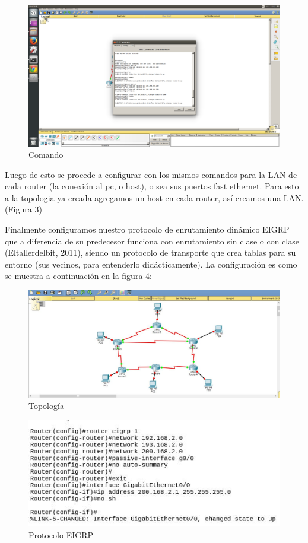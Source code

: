 \documentclass{article}
\begin{document}
\begin{figure}[h!]
\centering
\includegraphics[scale=0.08]{IMG2}
\caption{Comando}
\end{figure}

\newpage

Luego de esto se procede a configurar con los mismos comandos para la LAN de cada router (la conexión al pc, o host), o sea sus puertos fast ethernet. Para esto a la topologia ya creada agregamos un host en cada router, así creamos una LAN. (Figura 3)


Finalmente configuramos nuestro protocolo de enrutamiento dinámico EIGRP que a diferencia de su predecesor funciona con enrutamiento sin clase o con clase (Eltallerdelbit, 2011), siendo un protocolo de transporte que crea tablas para su entorno (sus vecinos, para entenderlo didácticamente). La configuración es como se muestra a continuación en la figura 4: 

\begin{figure}[h!]
\centering
\includegraphics[scale=0.3]{IMG3}
\caption{Topología}
\end{figure}

\begin{figure}[h!]
\centering
\includegraphics[scale=1]{IMG4}
\caption{Protocolo EIGRP}
\end{figure}
\end{document}
